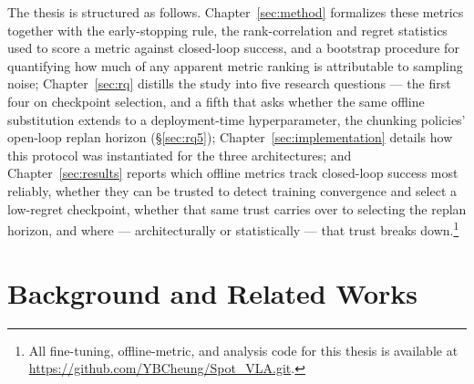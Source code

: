 \documentclass[english,12pt,a4paper,pdftex,elec,utf8]{aaltothesis}
\begin{document}
The thesis is structured as follows. Chapter~\ref{sec:method} formalizes these metrics together with the early-stopping rule, the rank-correlation and regret statistics used to score a metric against closed-loop success, and a bootstrap procedure for quantifying how much of any apparent metric ranking is attributable to sampling noise; Chapter~\ref{sec:rq} distills the study into five research questions --- the first four on checkpoint selection, and a fifth that asks whether the same offline substitution extends to a deployment-time hyperparameter, the chunking policies' open-loop replan horizon (\S\ref{sec:rq5}); Chapter~\ref{sec:implementation} details how this protocol was instantiated for the three architectures; and Chapter~\ref{sec:results} reports which offline metrics track closed-loop success most reliably, whether they can be trusted to detect training convergence and select a low-regret checkpoint, whether that same trust carries over to selecting the replan horizon, and where --- architecturally or statistically --- that trust breaks down.\footnote{All fine-tuning, offline-metric, and analysis code for this thesis is available at \url{https://github.com/YBCheung/Spot_VLA.git}.}


\clearpage



\section{Background and Related Works}



\end{document}
